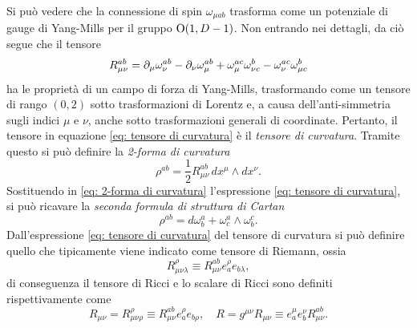 Si può vedere che la connessione di spin $\omega_{\mu ab}$ trasforma come un potenziale di gauge di Yang-Mills per il gruppo $\mathrm{O}(1, D -1)$. Non entrando nei dettagli, da ciò segue che il tensore
\begin{equation}
\label{eq: tensore di curvatura}
    R^{ab}_{\mu\nu} = \partial_\mu\omega^{ab}_\nu - \partial_\nu\omega^{ab}_\mu + \omega^{ac}_\mu\omega^b_{\nu c}- \omega^{ac}_\nu\omega^b_{\mu c}
\end{equation}
ha le proprietà di un campo di forza di Yang-Mills, trasformando come un tensore di rango $(0,2)$ sotto trasformazioni di Lorentz e, a causa dell'anti-simmetria sugli indici $\mu$ e $\nu$, anche sotto trasformazioni generali di coordinate. Pertanto, il tensore in equazione \eqref{eq: tensore di curvatura} è il \emph{tensore di curvatura}. Tramite questo si può definire la \emph{2-forma di curvatura} 
\begin{equation}
\label{eq: 2-forma di curvatura}
    \rho^{ab} = \frac{1}{2}R^{ab}_{\mu\nu}\,dx^\mu \wedge dx^\nu.
\end{equation}
Sostituendo in \eqref{eq: 2-forma di curvatura} l'espressione \eqref{eq: tensore di curvatura}, si può ricavare la \emph{seconda formula di struttura di Cartan}
\begin{equation}
\label{eq: seconda formula di struttura di Cartan}
    \rho^{ab} = d\omega^a_b + \omega^a_c \wedge \omega^c_b.
\end{equation}
Dall'espressione \eqref{eq: tensore di curvatura} del tensore di curvatura si può definire quello che tipicamente viene indicato come tensore di Riemann, ossia
\begin{equation}
    R^\rho_{\mu\nu\lambda} \equiv R^{ab}_{\mu\nu}e_a^\rho e_{b\lambda},
\end{equation}
di conseguenza il tensore di Ricci e lo scalare di Ricci sono definiti rispettivamente come  
\begin{equation}
    R_{\mu\nu} = R_{\mu\nu\rho}^\rho \equiv R^{ab}_{\mu\nu} e_a^\rho e_{b\rho} ,\quad R = g^{\mu\nu}R_{\mu\nu} \equiv e^\mu_ae^\nu_bR_{\mu\nu}^{ab}.
\end{equation}

